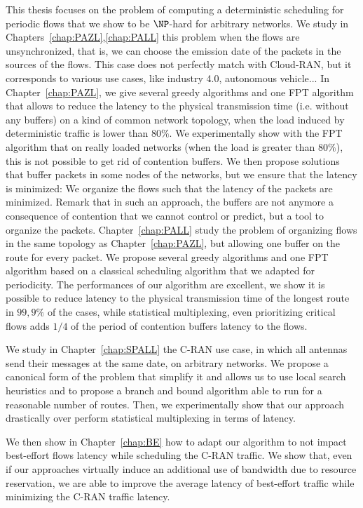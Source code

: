  This thesis focuses on the problem of computing a deterministic scheduling for periodic flows that we show to be $\NP$-hard for arbitrary networks.
 We study in Chapters~\ref{chap:PAZL},\ref{chap:PALL} this problem when the flows are unsynchronized, that is, we can choose the emission date of the packets in the sources of the flows. This case does not perfectly match with Cloud-RAN, but it corresponds to various use cases, like industry 4.0, autonomous vehicle...
In Chapter~\ref{chap:PAZL}, we give several greedy algorithms and one FPT algorithm that allows to reduce the latency to the physical transmission time (i.e. without any buffers) on a kind of common network topology, when the load induced by deterministic traffic is lower than $80\%$. We experimentally show with the FPT algorithm that on really loaded networks (when the load is greater than $80\%$), this is not possible to get rid of contention buffers. 
We then propose solutions that buffer packets in some nodes of the networks, but we ensure that the latency is minimized: We organize the flows such that the latency of the packets are minimized. Remark that in such an approach, the buffers are not anymore a consequence of contention that we cannot control or predict, but a tool to organize the packets.
Chapter~\ref{chap:PALL} study the problem of organizing flows in the same topology as Chapter~\ref{chap:PAZL}, but allowing one buffer on the route for every packet. We propose several greedy algorithms and one FPT algorithm based on a classical scheduling algorithm that we adapted for periodicity. The performances of our algorithm are excellent, we show it is possible to reduce latency to the physical transmission time of the longest route in $99,9\%$ of the cases, while statistical multiplexing, even prioritizing critical flows adds $1/4$ of the period of contention buffers latency to the flows.

We study in Chapter~\ref{chap:SPALL} the C-RAN use case, in which all antennas send their messages at the same date, on arbitrary networks. We propose a canonical form of the problem that simplify it and allows us to use local search heuristics and to propose a branch and bound algorithm able to run for a reasonable number of routes. Then, we experimentally show that our approach drastically over perform statistical multiplexing in terms of latency.

We then show in Chapter~\ref{chap:BE} how to adapt our algorithm to not impact best-effort flows latency while scheduling the C-RAN traffic. We show that, even if our approaches virtually induce an additional use of bandwidth due to resource reservation, we are able to improve the average latency of best-effort traffic while minimizing the C-RAN traffic latency.

